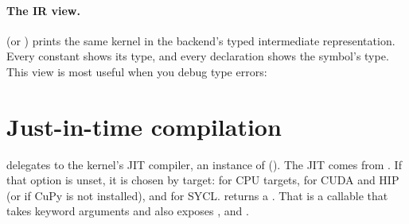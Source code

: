 \paragraph{The IR view.}
 (or ) prints the same kernel in
the backend's typed intermediate representation. Every constant shows its type, and
every declaration shows the symbol's type. This view is most useful when you debug type
errors:

\section{Just-in-time compilation}\label{r01:sec:jit}

 delegates to the kernel's JIT compiler, an instance of
 (). The JIT comes from . If
that option is unset, it is chosen by target:  for CPU targets, 
for CUDA and HIP (or  if CuPy is not installed), and  for SYCL.
 returns a . That is a callable that takes keyword
arguments and also exposes ,  and .

